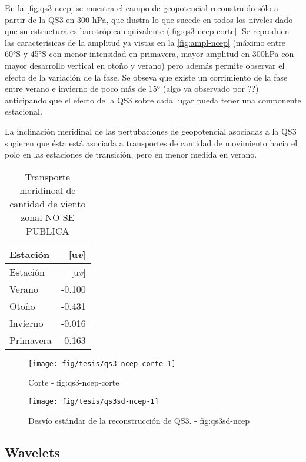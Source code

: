 \documentclass[spanish,a4paper]{book}
\begin{document}
En la \autoref{fig:qs3-ncep} se muestra el campo de geopotencial
reconstruido sólo a partir de la QS3 en 300 hPa, que ilustra lo que
sucede en todos los niveles dado que su estructura es barotrópica
equivalente (\autoref{fig:qs3-ncep-corte}. Se reproduen las
caracterísicas de la amplitud ya vistas en la \autoref{fig:ampl-ncep}
(máximo entre 60°S y 45°S con menor intensidad en primavera, mayor
amplitud en 300hPa con mayor desarrollo vertical en otoño y verano) pero
además permite observar el efecto de la variación de la fase. Se obseva
que existe un corrimiento de la fase entre verano e invierno de poco más
de 15° (algo ya observado por
??)
anticipando que el efecto de la QS3 sobre cada lugar 
pueda tener una componente estacional.

La inclinación meridinal de las pertubaciones de geopotencial asociadas
a la QS3 sugieren que ésta está asociada a transportes de cantidad de
movimiento hacia el polo en las estaciones de transición, pero en menor
medida en verano.

\begin{longtable}[]{@{}lr@{}}
\caption{Transporte meridinoal de cantidad de viento zonal NO SE
PUBLICA}\tabularnewline
\toprule
Estación & {[}u\emph{v}{]}\tabularnewline
\midrule
\endfirsthead
\toprule
Estación & {[}u\emph{v}{]}\tabularnewline
\midrule
\endhead
Verano & -0.100\tabularnewline
Otoño & -0.431\tabularnewline
Invierno & -0.016\tabularnewline
Primavera & -0.163\tabularnewline
\bottomrule
\end{longtable}

\begin{figure*}
\texttt{[image: fig/tesis/qs3-ncep-corte-1]} \caption{Corte - fig:qs3-ncep-corte}\label{fig:qs3-ncep-corte}
\end{figure*}

\begin{figure*}
\texttt{[image: fig/tesis/qs3sd-ncep-1]} \caption{Desvío estándar de la reconstrucción de QS3. - fig:qs3sd-ncep}\label{fig:qs3sd-ncep}
\end{figure*}


\subsection{Wavelets}\label{wavelets}
\end{document}
